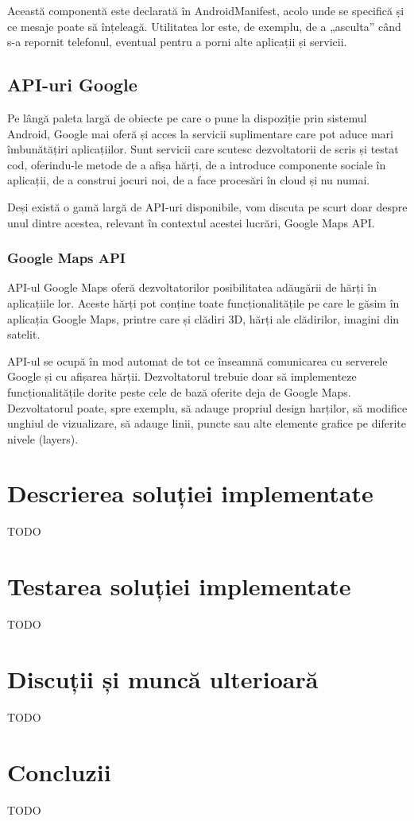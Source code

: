 \documentclass[12pt,a4paper]{article}
\begin{document}
Această componentă este declarată în AndroidManifest, acolo unde se specifică și ce mesaje poate să înțeleagă. Utilitatea lor este, de exemplu, de a „asculta” când s-a repornit telefonul, eventual pentru a porni alte aplicații și servicii.

\newpage
\subsection{API-uri Google}
Pe lângă paleta largă de obiecte pe care o pune la dispoziție prin sistemul Android, Google mai oferă și acces la servicii suplimentare care pot aduce mari îmbunătățiri aplicațiilor. Sunt servicii care scutesc dezvoltatorii de scris și testat cod, oferindu-le metode de a afișa hărți, de a introduce componente sociale în aplicații, de a construi jocuri noi, de a face procesări în cloud și nu numai.

Deși există o gamă largă de API-uri disponibile, vom discuta pe scurt doar despre unul dintre acestea, relevant în contextul acestei lucrări, Google Maps API.

\subsubsection{Google Maps API \cite{GoogleMapsAndroidAPI}}
API-ul Google Maps oferă dezvoltatorilor posibilitatea adăugării de hărți în aplicațiile lor. Aceste hărți pot conține toate funcționalitățile pe care le găsim în aplicația Google Maps, printre care și clădiri 3D, hărți ale clădirilor, imagini din satelit.

API-ul se ocupă în mod automat de tot ce înseamnă comunicarea cu serverele Google și cu afișarea hărții. Dezvoltatorul trebuie doar să implementeze funcționalitățile dorite peste cele de bază oferite deja de Google Maps. Dezvoltatorul poate, spre exemplu, să adauge propriul design harților, să modifice unghiul de vizualizare, să adauge linii, puncte sau alte elemente grafice pe diferite nivele (layers).

\newpage




\newpage
\section{Descrierea soluției implementate} \label{DescriereAplicatie}
TODO



\newpage
\section{Testarea soluției implementate} \label{TestareAplicatie}
TODO


\newpage
\section{Discuții și muncă ulterioară} \label{Discutii}
TODO



\newpage
\section{Concluzii} \label{Concluzii}
TODO



\newpage
{}


\nocite{*}
\end{document}
